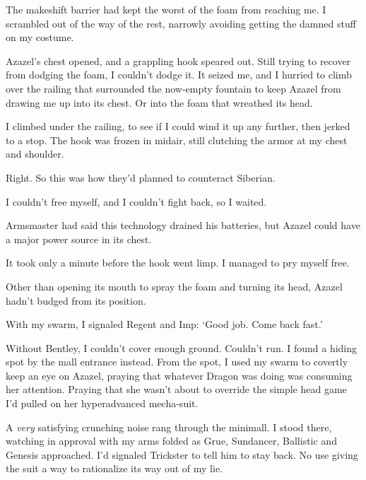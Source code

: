 The makeshift barrier had kept the worst of the foam from reaching me.  I scrambled out of the way of the rest, narrowly avoiding getting the damned stuff on my costume.



Azazel's chest opened, and a grappling hook speared out.  Still trying to recover from dodging the foam, I couldn't dodge it.  It seized me, and I hurried to climb over the railing that surrounded the now-empty fountain to keep Azazel from drawing me up into its chest.  Or into the foam that wreathed its head.



I climbed under the railing, to see if I could wind it up any further, then jerked to a stop.  The hook was frozen in midair, still clutching the armor at my chest and shoulder.



Right.  So this was how they'd planned to counteract Siberian.



I couldn't free myself, and I couldn't fight back, so I waited.



Armsmaster had said this technology drained his batteries, but Azazel could have a major power source in its chest.



It took only a minute before the hook went limp.  I managed to pry myself free.



Other than opening its mouth to spray the foam and turning its head, Azazel hadn't budged from its position.



With my swarm, I signaled Regent and Imp:  `Good job.  Come back fast.'



Without Bentley, I couldn't cover enough ground.  Couldn't run.  I found a hiding spot by the mall entrance instead.  From the spot, I used my swarm to covertly keep an eye on Azazel, praying that whatever Dragon was doing was consuming her attention.  Praying that she wasn't about to override the simple head game I'd pulled on her hyperadvanced mecha-suit.



\blacksquare



A \emph{very} satisfying crunching noise rang through the minimall.  I stood there, watching in approval with my arms folded as Grue, Sundancer, Ballistic and Genesis approached.  I'd signaled Trickster to tell him to stay back.  No use giving the suit a way to rationalize its way out of my lie.




